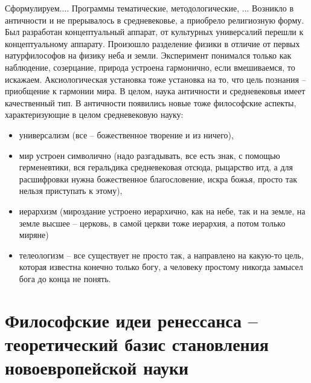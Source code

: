 \documentclass[a4paper, 12pt]{article}
\begin{document}
Сформулируем.... Программы тематические, методологические, ... Возникло 
в античности и не прерывалось в средневековье, а приобрело религиозную 
форму. Был разработан концептуальный аппарат, от культурных универсалий 
перешли к концептуальному аппарату. Произошло разделение физики 
в отличие от первых натурфилософов на физику неба и земли. Эксперимент 
понимался только как наблюдение, созерцание, природа устроена 
гармонично, если вмешиваемся, то искажаем. Аксиологическая установка 
тоже установка на то, что цель познания -- приобщение к гармонии мира. 
В целом, наука античности и средневековья имеет качественный тип. 
В античности появились новые тоже философские аспекты, характеризующие 
в целом средневековую науку:
\begin{itemize}
  \item универсализм (все -- божественное творение 
    и из ничего),
  \item мир устроен символично (надо разгадывать, все есть знак, 
    с помощью герменевтики, вся геральдика средневековая отсюда, 
    рыцарство итд, а для расшифровки нужна божественное благословение, 
    искра божья, просто так нельзя приступать к этому),
  \item иерархизм (мироздание устроено иерархично, как на небе, так и на 
    земле, на земле высшее -- церковь, в самой церкви тоже иерархия, 
    а потом только миряне)
  \item телеологизм -- все существует не просто так, а направлено на 
    какую-то цель, которая известна конечно только богу, а человеку 
    простому никогда замысел бога до конца не понять.
\end{itemize}

\section{Философские идеи ренессанса -- теоретический базис становления 
новоевропейской науки}
\end{document}
